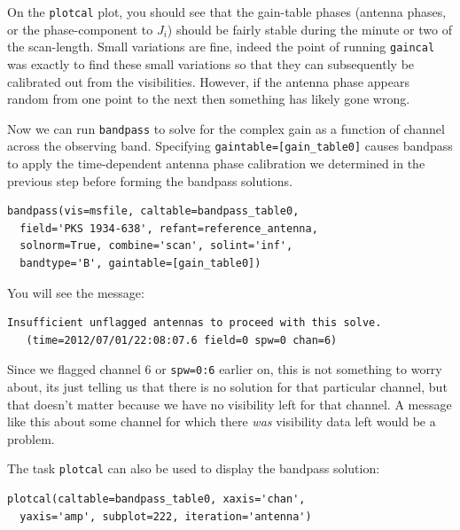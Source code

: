 \documentclass[force,almostfull,justified]{tufte-book}
\begin{document}
On the {\tt plotcal} plot, you should see that the gain-table phases (antenna phases, or the
phase-component to $J_i$) should be fairly stable during the minute or two of the scan-length.  Small
variations are fine, indeed the point of running {\tt gaincal} was exactly to find these small
variations so that they can subsequently be calibrated out from the visibilities.  However, if the
antenna phase appears random from one point to the next then something has likely gone wrong.

Now we can run {\tt bandpass} to solve for the complex gain as a function of channel across the
observing band.  Specifying {\tt gaintable=[gain\_table0]} causes bandpass to apply the time-dependent
antenna phase calibration we determined in the previous step before forming the bandpass solutions.

\begin{casacmd}
\begin{verbatim}
bandpass(vis=msfile, caltable=bandpass_table0,
  field='PKS 1934-638', refant=reference_antenna,
  solnorm=True, combine='scan', solint='inf',
  bandtype='B', gaintable=[gain_table0])
\end{verbatim}
\end{casacmd}

You will see the message:
\begin{verbatim}
Insufficient unflagged antennas to proceed with this solve.
   (time=2012/07/01/22:08:07.6 field=0 spw=0 chan=6)
\end{verbatim}

Since we flagged channel 6 or {\tt spw=0:6} earlier on, this is not something to worry about, its just
telling us that there is no solution for that particular channel, but that doesn't matter because we
have no visibility left for that channel.  A message like this about some channel for which there {\em
was} visibility data left would be a problem.

The task {\tt plotcal} can also be used to display the bandpass solution:

\begin{casacmd}
\begin{verbatim}
plotcal(caltable=bandpass_table0, xaxis='chan',
  yaxis='amp', subplot=222, iteration='antenna')
\end{verbatim}
\end{casacmd}
\end{document}
